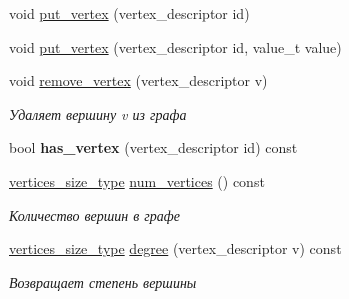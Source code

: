 \begin{DoxyCompactItemize}
\item 
void \hyperlink{class_s_p_u___g_r_a_p_h_1_1_spu_ultra_graph_a70ef248cfbbebeda913dcde3507bb9ef}{put\+\_\+vertex} (vertex\+\_\+descriptor id)
\item 
void \hyperlink{class_s_p_u___g_r_a_p_h_1_1_spu_ultra_graph_a15f743f63444cd9cb8ecc1c9f611083f}{put\+\_\+vertex} (vertex\+\_\+descriptor id, value\+\_\+t value)
\item 
\mbox{\label{class_s_p_u___g_r_a_p_h_1_1_spu_ultra_graph_a981bb0adc93500e1650d9f2a4c0f023e}} 
void \hyperlink{class_s_p_u___g_r_a_p_h_1_1_spu_ultra_graph_a981bb0adc93500e1650d9f2a4c0f023e}{remove\+\_\+vertex} (vertex\+\_\+descriptor v)
\begin{DoxyCompactList}\small\item\em Удаляет вершину v из графа \end{DoxyCompactList}\item 
\mbox{\label{class_s_p_u___g_r_a_p_h_1_1_spu_ultra_graph_a829d00276794f555b8620219f2f14be4}} 
bool {\bfseries has\+\_\+vertex} (vertex\+\_\+descriptor id) const
\item 
\mbox{\label{class_s_p_u___g_r_a_p_h_1_1_spu_ultra_graph_a3815fc3e3cac1198e50ce271d6e67000}} 
\hyperlink{class_s_p_u___g_r_a_p_h_1_1_spu_ultra_graph_af8312efee580452b40e3750d8acf3b08}{vertices\+\_\+size\+\_\+type} \hyperlink{class_s_p_u___g_r_a_p_h_1_1_spu_ultra_graph_a3815fc3e3cac1198e50ce271d6e67000}{num\+\_\+vertices} () const
\begin{DoxyCompactList}\small\item\em Количество вершин в графе \end{DoxyCompactList}\item 
\mbox{\label{class_s_p_u___g_r_a_p_h_1_1_spu_ultra_graph_a998c3045e8f40869bdcc5a0f12199cd7}} 
\hyperlink{class_s_p_u___g_r_a_p_h_1_1_spu_ultra_graph_af8312efee580452b40e3750d8acf3b08}{vertices\+\_\+size\+\_\+type} \hyperlink{class_s_p_u___g_r_a_p_h_1_1_spu_ultra_graph_a998c3045e8f40869bdcc5a0f12199cd7}{degree} (vertex\+\_\+descriptor v) const
\begin{DoxyCompactList}\small\item\em Возвращает степень вершины \end{DoxyCompactList}\item 

\end{DoxyCompactItemize}
